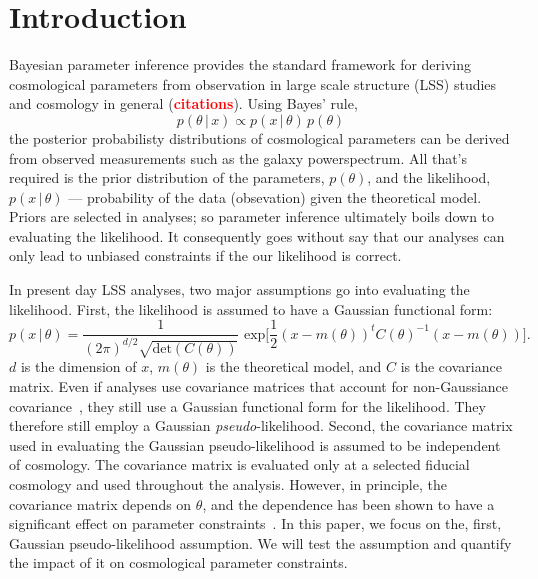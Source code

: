 \documentclass[12pt, letterpaper, preprint]{aastex}
\newcommand{\beq}{\begin{equation}}
\newcommand{\eeq}{\end{equation}}
\newcommand{\todo}[1]{{\bf \textcolor{red}{#1}}}
\begin{document}
\section{Introduction}
Bayesian parameter inference provides the standard framework for 
deriving cosmological parameters from observation in large scale 
structure (LSS) studies and cosmology in general (\todo{citations}). 
Using Bayes' rule, 
\beq
p( \theta\,|\,x) \propto p( x\,|\,\theta) \, p(\theta)
\eeq
the posterior probabilisty distributions of cosmological parameters
can be derived from observed measurements such as the galaxy 
powerspectrum. All that's required is the prior distribution of the 
parameters, $p(\theta)$, and the likelihood, $p( x\,|\,\theta)$ --- 
probability of the data (obsevation) given the theoretical model.
Priors are selected in analyses; so parameter inference ultimately 
boils down to evaluating the likelihood. It consequently goes without 
say that our analyses can only lead to unbiased constraints if the our 
likelihood is correct. 

In present day LSS analyses, two major assumptions go into evaluating the 
likelihood. First, the likelihood is assumed to have a Gaussian functional 
form: 
\beq
p(x\,|\,\theta) = \frac{1}{(2\pi)^{d/2} \sqrt{\mathrm{det}(C(\theta))}}\,\,\mathrm{exp}\bigg[\frac{1}{2}(x - m(\theta))^{t} C(\theta)^{-1} (x - m(\theta))\bigg].
\eeq
$d$ is the dimension of $x$, $m(\theta)$ is the theoretical model, and $C$ 
is the covariance matrix. Even if analyses use covariance matrices 
that account for non-Gaussiance covariance~\citep[\emph{e.g.}][]{scoccimarro1999, hu2001, oconnell2016}, 
they still use a Gaussian functional form for the likelihood. They 
therefore still employ a Gaussian \emph{pseudo}-likelihood. Second, the 
covariance matrix used in evaluating the Gaussian pseudo-likelihood
is assumed to be independent of cosmology. The covariance matrix is 
evaluated only at a selected fiducial cosmology and used throughout 
the analysis. However, in principle, the covariance matrix depends on $\theta$, 
and the dependence has been shown to have a significant effect 
on parameter constraints~\citep[\emph{e.g.}][]{eifler2009, morrison2013, white2015}. 
In this paper, we focus on the, first, Gaussian pseudo-likelihood assumption. 
We will test the assumption and quantify the impact of it on cosmological 
parameter constraints. 
\end{document}
